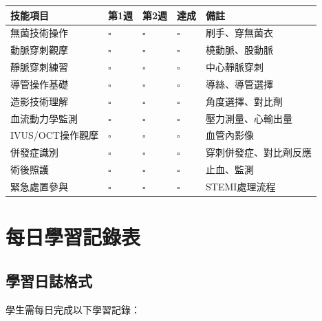\documentclass[12pt,a4paper]{article}
\begin{document}
\begin{longtable}{|>{\raggedright\arraybackslash}p{4cm}|>{\raggedright\arraybackslash}p{2cm}|>{\raggedright\arraybackslash}p{2cm}|>{\raggedright\arraybackslash}p{2cm}|>{\raggedright\arraybackslash}p{4cm}|}
\hline
\rowcolor{light_green}
\textbf{技能項目} & \textbf{第1週} & \textbf{第2週} & \textbf{達成} & \textbf{備註} \\
\hline
無菌技術操作 & $\square$ & $\square$ & $\square$ & 刷手、穿無菌衣 \\
\hline
動脈穿刺觀摩 & $\square$ & $\square$ & $\square$ & 橈動脈、股動脈 \\
\hline
靜脈穿刺練習 & $\square$ & $\square$ & $\square$ & 中心靜脈穿刺 \\
\hline
導管操作基礎 & $\square$ & $\square$ & $\square$ & 導絲、導管選擇 \\
\hline
造影技術理解 & $\square$ & $\square$ & $\square$ & 角度選擇、對比劑 \\
\hline
血流動力學監測 & $\square$ & $\square$ & $\square$ & 壓力測量、心輸出量 \\
\hline
IVUS/OCT操作觀摩 & $\square$ & $\square$ & $\square$ & 血管內影像 \\
\hline
併發症識別 & $\square$ & $\square$ & $\square$ & 穿刺併發症、對比劑反應 \\
\hline
術後照護 & $\square$ & $\square$ & $\square$ & 止血、監測 \\
\hline
緊急處置參與 & $\square$ & $\square$ & $\square$ & STEMI處理流程 \\
\hline
\end{longtable}

\section{每日學習記錄表}

\subsection{學習日誌格式}
學生需每日完成以下學習記錄：
\end{document}
